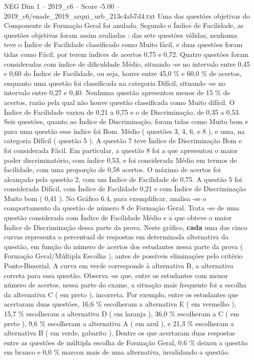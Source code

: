 \begin{textsample}{NEG Dim 1 – 2019\_c6 – Score -5.00 – 2019\_c6/enade\_2019\_arqui\_urb\_213c4ab7d4.txt}
Uma das questões objetivas do Componente de Formação Geral foi anulada.
Segundo o Índice de Facilidade, as questões objetivas foram assim avaliadas : das sete questões válidas, nenhuma teve o Índice de Facilidade classificado como Muito fácil, e duas questões foram tidas como Fácil, por terem índices de acertos 0,75 e 0,72.
Quatro questões foram consideradas com índice de dificuldade Médio, situando -se no intervalo entre 0,45 e 0,60 do Índice de Facilidade, ou seja, houve entre 45,0 \% e 60,0 \% de acertos, enquanto uma questão foi classificada na categoria Difícil, situando -se no intervalo entre 0,27 e 0,40.
Nenhuma questão apresentou menos de 15 \% de acertos, razão pela qual não houve questão classificada como Muito difícil.
O Índice de Facilidade variou de 0,21 a 0,75 e o de Discriminação, de 0,35 a 0,53.
Seis questões, quanto ao Índice de Discriminação, foram tidas como Muito bom e para uma questão esse índice foi Bom.
Médio ( questões 3, 4, 6, e 8 ), e uma, na categoria Difícil ( questão 5 ).
A questão 7 teve Índice de Discriminação Bom e foi considerada Fácil.
Em particular, a questão 8 foi a que apresentou o maior poder discriminatório, com índice 0,53, e foi considerada Médio em termos de facilidade, com uma proporção de 0,58 acertos.
O máximo de acertos foi alcançado pela questão 2, com um Índice de Facilidade de 0,75.
A questão 5 foi considerada Difícil, com Índice de Facilidade 0,21 e com Índice de Discriminação Muito bom ( 0,41 ).
No Gráfico 6.4, para exemplificar, analisa -se o comportamento da questão de número 8 de Formação Geral.
Trata -se de uma questão considerada com Índice de Facilidade Médio e a que obteve o maior Índice de Discriminação dessa parte da prova.
Neste gráfico, \textbf{cada} uma das cinco curvas representa o percentual de respostas em determinada alternativa da questão, em função do número de acertos dos estudantes nessa parte da prova ( Formação Geral/Múltipla Escolha ), antes de possíveis eliminações pelo critério Ponto-Bisserial.
A curva em verde corresponde à alternativa B, a alternativa correta para essa questão.
Observa -se que, entre os estudantes com menor número de acertos, nessa parte do exame, a situação mais frequente foi a escolha da alternativa C ( em preto ), incorreta.
Por exemplo, entre os estudantes que acertaram duas questões, 16,6 \% escolheram a alternativa E ( em vermelho ), 15,7 \% escolheram a alternativa D ( em laranja ), 36,0 \% escolheram a C ( em preto ), 9,6 \% escolheram a alternativa A ( em azul ), e 21,3 \% escolheram a alternativa B ( em verde, gabarito ).
Dentre os que acertaram duas respostas entre as questões de múltipla escolha de Formação Geral, 0,6 \% deixou a questão em branco e 0,0 \% marcou mais de uma alternativa, invalidando a questão.

\end{textsample}
